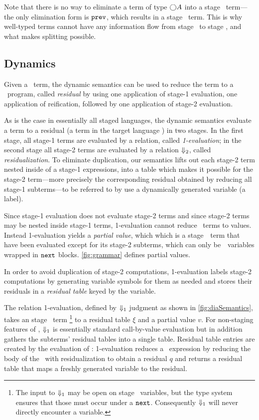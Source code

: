 Note that there is no way to eliminate a term of type $\bigcirc A$ into a stage
\bbone\ term---the only elimination form is ${\tt prev}$, which results in a stage
\bbtwo\ term. This is why well-typed terms cannot have any information flow
from stage \bbtwo\ to stage \bbone, and what makes splitting possible.

\subsection{Dynamics}
\label{sec:stagedsemantics}


Given a \lang\ term, the dynamic semantics can be used
to reduce the term to a \langmono\ program, called {\em residual} by
using one application of stage-1 evaluation, one application of
reification, followed by one application of stage-2 evaluation.

As is the case in essentially all staged languages, the dynamic
semantics evaluate a term to a residual (a term in the target
language \langTwo) in two stages. In the first stage, all stage-1
terms are evaluated by a relation, called {\em 1-evaluation}; in the
second stage all stage-2 terms are evaluated by a relation
${\Downarrow_{ 2}}$, called {\em residualization}.  To eliminate duplication,
our semantics lifts out each stage-2 term nested inside of a stage-1
expressions, into a table which makes it possible for the stage-2
term---more precisely the corresponding residual obtained by reducing
all stage-1 subterms---to be referred to by use a dynamically
generated variable (a label).



Since stage-1 evaluation does not evaluate stage-2 terms and since
stage-2 terms may be nested inside stage-1 terms, 1-evaluation cannot
reduce \lang\ terms to values.  Instead 1-evaluation yields a {\em
  partial value}, which which is a stage~\bbone\ term that have been
evaluated except for its stage-2 subterms, which can only
be~\bbtwo\ variables wrapped in ${\tt next}$ blocks.  \ref{fig:grammar}
defines partial values.

In order to avoid duplication of stage-2 computations, 1-evaluation
labels stage-2 computations by generating variable symbols for them as
needed and stores their residuals in a {\em residual table} keyed by
the variable.

The relation 1-evaluation, defined by ${\Downarrow_{ 1}}$ judgment as shown
in \ref{fig:diaSemantics}, takes an stage \bbone\ term%
\footnote{ The input to ${\Downarrow_{ 1}}$ may be open on stage \bbtwo\ variables, but
the type system ensures that those must occur under a ${\tt next}$. Consequently
${\Downarrow_{ 1}}$ will never directly encounter a variable.}
%
to a residual table $\xi$ and a partial value $v$.  For non-staging
features of \lang, ${\Downarrow_{ 1}}$ is essentially standard call-by-value
evaluation but in addition gathers the subterms' residual tables into
a single table. Residual table entries are created by the
evaluation of \next: 1-evaluation reduces a \next\ expression by
reducing the body of the \next\ with residualization to obtain a
residual $q$ and returns a residual table that maps a freshly
generated variable to the residual. 

